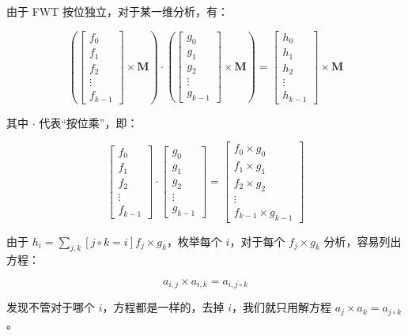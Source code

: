 \documentclass{article}
\begin{document}
由于 FWT 按位独立，对于某一维分析，有：

$$\left(\begin{bmatrix}f_0 \\ f_1 \\ f_2 \\ \vdots \\ f_{k-1} \end{bmatrix}\times \mathbf{M} \right) \cdot \left(\begin{bmatrix}g_0 \\ g_1 \\ g_2 \\ \vdots \\ g_{k-1} \end{bmatrix}\times \mathbf{M}\right) = \begin{bmatrix}h_0 \\ h_1 \\ h_2 \\ \vdots \\ h_{k-1} \end{bmatrix}\times \mathbf{M}$$

其中 $\cdot$ 代表“按位乘”，即：

$$\begin{bmatrix}f_0 \\ f_1 \\ f_2 \\ \vdots \\ f_{k-1} \end{bmatrix} \cdot \begin{bmatrix}g_0 \\ g_1 \\ g_2 \\ \vdots \\ g_{k-1} \end{bmatrix} = \begin{bmatrix}f_0 \times g_0 \\ f_1 \times g_1 \\ f_2 \times g_2 \\ \vdots \\ f_{k-1} \times g_{k-1} \end{bmatrix}$$

由于 $h_{i}=\sum_{j,k} [j \circ k =i]f_{j} \times g_{k}$，枚举每个 $i$，对于每个 $f_j \times g_k$ 分析，容易列出方程：

$$a_{i,j} \times a_{i,k}=a_{i,j \circ k}$$

发现不管对于哪个 $i$，方程都是一样的，去掉 $i$，我们就只用解方程 $a_{j} \times a_{k}=a_{j \circ k}$。
\end{document}
